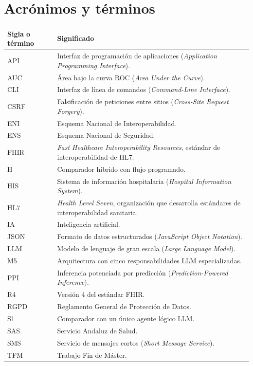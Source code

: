 \chapter*{Acrónimos y términos}

\begin{longtable}{L{0.22\textwidth}L{0.68\textwidth}}
\toprule
\textbf{Sigla o término} & \textbf{Significado} \\
\midrule
\endhead
API & Interfaz de programación de aplicaciones (\emph{Application Programming Interface}). \\
AUC & Área bajo la curva ROC (\emph{Area Under the Curve}). \\
CLI & Interfaz de línea de comandos (\emph{Command-Line Interface}). \\
CSRF & Falsificación de peticiones entre sitios (\emph{Cross-Site Request Forgery}). \\
ENI & Esquema Nacional de Interoperabilidad. \\
ENS & Esquema Nacional de Seguridad. \\
FHIR & \emph{Fast Healthcare Interoperability Resources}, estándar de interoperabilidad de HL7. \\
H & Comparador híbrido con flujo programado. \\
HIS & Sistema de información hospitalaria (\emph{Hospital Information System}). \\
HL7 & \emph{Health Level Seven}, organización que desarrolla estándares de interoperabilidad sanitaria. \\
IA & Inteligencia artificial. \\
JSON & Formato de datos estructurados (\emph{JavaScript Object Notation}). \\
LLM & Modelo de lenguaje de gran escala (\emph{Large Language Model}). \\
M5 & Arquitectura con cinco responsabilidades LLM especializadas. \\
PPI & Inferencia potenciada por predicción (\emph{Prediction-Powered Inference}). \\
R4 & Versión 4 del estándar FHIR. \\
RGPD & Reglamento General de Protección de Datos. \\
S1 & Comparador con un único agente lógico LLM. \\
SAS & Servicio Andaluz de Salud. \\
SMS & Servicio de mensajes cortos (\emph{Short Message Service}). \\
TFM & Trabajo Fin de Máster. \\
\bottomrule
\end{longtable}

